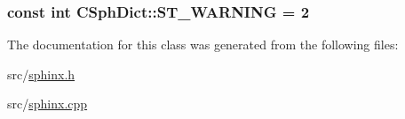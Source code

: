 \hypertarget{classCSphDict_ae9298ace35a55c894fb5b0ff8bbc9d07}{
\subsubsection[{S\-T\-\_\-\-W\-A\-R\-N\-I\-N\-G}]{\setlength{\rightskip}{0pt plus 5cm}const {\bf int} C\-Sph\-Dict\-::\-S\-T\-\_\-\-W\-A\-R\-N\-I\-N\-G = 2\hspace{0.3cm}{\ttfamily [static]}}}\label{classCSphDict_ae9298ace35a55c894fb5b0ff8bbc9d07}


The documentation for this class was generated from the following files\-:\begin{DoxyCompactItemize}
\item 
src/\hyperlink{sphinx_8h}{sphinx.\-h}\item 
src/\hyperlink{sphinx_8cpp}{sphinx.\-cpp}\end{DoxyCompactItemize}
